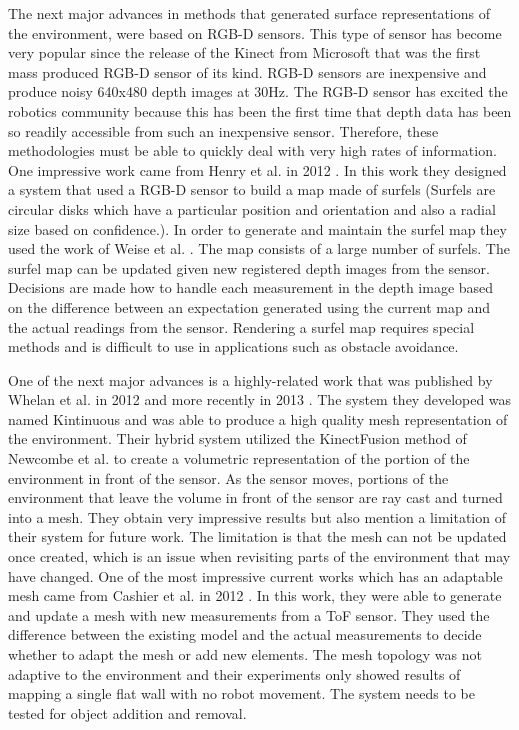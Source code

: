 The next major advances in methods that generated surface representations of the
environment, were based on RGB-D sensors. This type of sensor has become very
popular since the release of the Kinect from Microsoft that was the first mass
produced RGB-D sensor of its kind. RGB-D sensors are inexpensive and produce
noisy 640x480 depth images at 30Hz. The RGB-D sensor has excited the robotics
community because this has been the first time that depth data has been so
readily accessible from such an inexpensive sensor. Therefore, these
methodologies must be able to quickly deal with very high rates of information.
One impressive work came from Henry et al. in 2012 \cite{Henry2012}. In this
work they designed a system that used a RGB-D sensor to build a map made of
surfels (Surfels are circular disks which have a particular position and
orientation and also a radial size based on confidence.). In order to generate
and maintain the surfel map they used the work of Weise et al. \cite{Weise2009}.
The map consists of a large number of surfels. The surfel map can be updated
given new registered depth images from the sensor. Decisions are made how to
handle each measurement in the depth image based on the difference between an
expectation generated using the current map and the actual readings from the
sensor. Rendering a surfel map requires special methods \cite{Pfister2000} and
is difficult to use in applications such as obstacle avoidance.

One of the next major advances is a highly-related work that was published by
Whelan et al. in 2012 \cite{Whelan2012} and more recently in 2013
\cite{Whelan12tr}. The system they developed was named Kintinuous and was able
to produce a high quality mesh representation of the environment. Their hybrid
system utilized the KinectFusion method \cite{Newcombe2011a} of Newcombe et al.
to create a volumetric representation of the portion of the environment in front
of the sensor. As the sensor moves, portions of the environment that leave the
volume in front of the sensor are ray cast and turned into a mesh. They obtain
very impressive results but also mention a limitation of their system for future
work. The limitation is that the mesh can not be updated once created, which is
an issue when revisiting parts of the environment that may have changed. One of
the most impressive current works which has an adaptable mesh came from Cashier
et al. in 2012 \cite{Cahier2012}. In this work, they were able to generate and
update a mesh with new measurements from a ToF sensor. They used the difference
between the existing model and the actual measurements to decide whether to
adapt the mesh or add new elements. The mesh topology was not adaptive to the
environment and their experiments only showed results of mapping a single flat
wall with no robot movement. The system needs to be tested for object addition
and removal.

